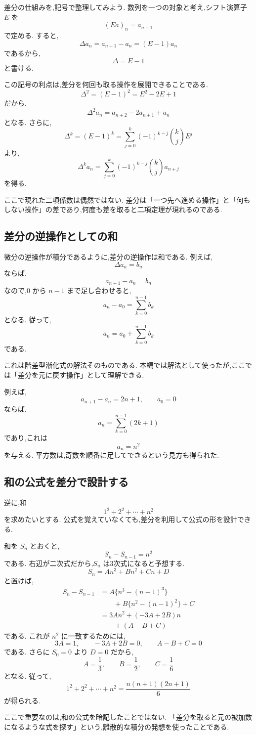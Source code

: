差分の仕組みを,記号で整理してみよう.
数列を一つの対象と考え,シフト演算子 $E$ を
\[
  (Ea)_n=a_{n+1}
\]
で定める.
すると,
\[
  \Delta a_n=a_{n+1}-a_n=(E-1)a_n
\]
であるから,
\[
  \Delta=E-1
\]
と書ける.

この記号の利点は,差分を何回も取る操作を展開できることである.
\[
  \Delta^2=(E-1)^2=E^2-2E+1
\]
だから,
\[
  \Delta^2a_n=a_{n+2}-2a_{n+1}+a_n
\]
となる.
さらに,
\[
  \Delta^k=(E-1)^k
  =\sum_{j=0}^{k}(-1)^{k-j}\binom{k}{j}E^j
\]
より,
\[
  \Delta^ka_n
  =\sum_{j=0}^{k}(-1)^{k-j}\binom{k}{j}a_{n+j}
\]
を得る.

ここで現れた二項係数は偶然ではない.
差分は「一つ先へ進める操作」と「何もしない操作」の差であり,何度も差を取ると二項定理が現れるのである.

\subsection{差分の逆操作としての和}

微分の逆操作が積分であるように,差分の逆操作は和である.
例えば,
\[
  \Delta a_n=b_n
\]
ならば,
\[
  a_{n+1}-a_n=b_n
\]
なので,$0$ から $n-1$ まで足し合わせると,
\[
  a_n-a_0=\sum_{k=0}^{n-1}b_k
\]
となる.
従って,
\[
  a_n=a_0+\sum_{k=0}^{n-1}b_k
\]
である.

これは階差型漸化式の解法そのものである.
本編では解法として使ったが,ここでは「差分を元に戻す操作」として理解できる.

例えば,
\[
  a_{n+1}-a_n=2n+1,\qquad a_0=0
\]
ならば,
\[
  a_n=\sum_{k=0}^{n-1}(2k+1)
\]
であり,これは
\[
  a_n=n^2
\]
を与える.
平方数は,奇数を順番に足してできるという見方も得られた.

\subsection{和の公式を差分で設計する}

逆に,和
\[
  1^2+2^2+\cdots+n^2
\]
を求めたいとする.
公式を覚えていなくても,差分を利用して公式の形を設計できる.

和を $S_n$ とおくと,
\[
  S_n-S_{n-1}=n^2
\]
である.
右辺が二次式だから,$S_n$ は3次式になると予想する.
\[
  S_n=An^3+Bn^2+Cn+D
\]
と置けば,
\begin{align*}
  S_n-S_{n-1}& =A\{n^3-(n-1)^3\}\\
  &\qquad +B\{n^2-(n-1)^2\}+C   \\
  & =3An^2+(-3A+2B)n\\
  &\qquad +(A-B+C)
\end{align*}
である.
これが $n^2$ に一致するためには,
\[
  3A=1,\qquad -3A+2B=0,\qquad A-B+C=0
\]
である.
さらに $S_0=0$ より $D=0$ だから,
\[
  A=\frac13,\qquad B=\frac12,\qquad C=\frac16
\]
となる.
従って,
\[
  1^2+2^2+\cdots+n^2
  =\frac{n(n+1)(2n+1)}6
\]
が得られる.

ここで重要なのは,和の公式を暗記したことではない.
「差分を取ると元の被加数になるような式を探す」という,離散的な積分の発想を使ったことである.
